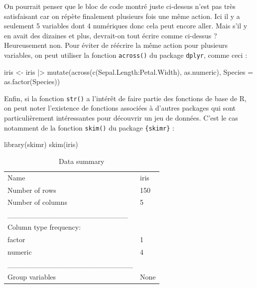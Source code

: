 \documentclass[
  letterpaper,
]{book}
\newenvironment{Shaded}{\begin{snugshade}}{\end{snugshade}}
\newcommand{\AttributeTok}[1]{\textcolor[rgb]{0.40,0.45,0.13}{#1}}
\newcommand{\FunctionTok}[1]{\textcolor[rgb]{0.28,0.35,0.67}{#1}}
\newcommand{\NormalTok}[1]{\textcolor[rgb]{0.00,0.23,0.31}{#1}}
\newcommand{\OtherTok}[1]{\textcolor[rgb]{0.00,0.23,0.31}{#1}}
\newcommand{\SpecialCharTok}[1]{\textcolor[rgb]{0.37,0.37,0.37}{#1}}
\begin{document}
On pourrait penser que le bloc de code montré juste ci-dessus n'est pas
très satisfaisant car on répète finalement plusieurs fois une même
action. Ici il y a seulement 5 variables dont 4 numériques donc cela
peut encore aller. Mais s'il y en avait des dizaines et plus, devrait-on
tout écrire comme ci-dessus ? Heureusement non. Pour éviter de réécrire
la même action pour plusieurs variables, on peut utiliser la fonction
\texttt{across()} du package \texttt{dplyr}, comme ceci :

\begin{Shaded}
\begin{Highlighting}[]
\NormalTok{iris }\OtherTok{\textless{}{-}}
\NormalTok{  iris }\SpecialCharTok{|\textgreater{}}
  \FunctionTok{mutate}\NormalTok{(}\FunctionTok{across}\NormalTok{(}\FunctionTok{c}\NormalTok{(Sepal.Length}\SpecialCharTok{:}\NormalTok{Petal.Width), as.numeric),}
         \AttributeTok{Species =} \FunctionTok{as.factor}\NormalTok{(Species))}
\end{Highlighting}
\end{Shaded}

Enfin, si la fonction \texttt{str()} a l'intérêt de faire partie des
fonctions de base de R, on peut noter l'existence de fonctions associées
à d'autres packages qui sont particulièrement intéressantes pour
découvrir un jeu de données. C'est le cas notamment de la fonction
\texttt{skim()} du package \texttt{\{skimr\}} :

\begin{Shaded}
\begin{Highlighting}[]
\FunctionTok{library}\NormalTok{(skimr)}
\FunctionTok{skim}\NormalTok{(iris)}
\end{Highlighting}
\end{Shaded}

\begin{longtable}[]{@{}ll@{}}
\caption{Data summary}\tabularnewline
\toprule\noalign{}
\endfirsthead
\endhead
\bottomrule\noalign{}
\endlastfoot
Name & iris \\
Number of rows & 150 \\
Number of columns & 5 \\
\_\_\_\_\_\_\_\_\_\_\_\_\_\_\_\_\_\_\_\_\_\_\_ & \\
Column type frequency: & \\
factor & 1 \\
numeric & 4 \\
\_\_\_\_\_\_\_\_\_\_\_\_\_\_\_\_\_\_\_\_\_\_\_\_ & \\
Group variables & None \\
\end{longtable}
\end{document}
